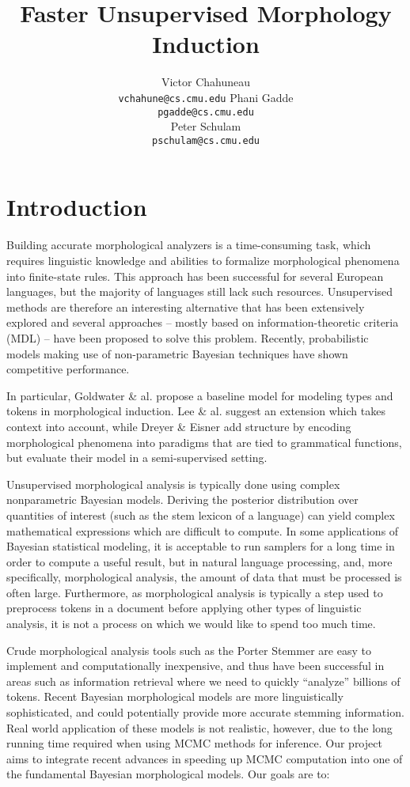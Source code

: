 \documentclass{article}
\title{Faster Unsupervised Morphology Induction}
\author{
Victor Chahuneau\\
\texttt{vchahune@cs.cmu.edu}
\And
Phani Gadde\\
\texttt{pgadde@cs.cmu.edu} \\
\And
Peter Schulam\\
\texttt{pschulam@cs.cmu.edu}
}
\begin{document}
\maketitle

\section{Introduction}
\label{sec:introduction}

Building accurate morphological analyzers is a time-consuming task,
which requires linguistic knowledge and abilities to formalize
morphological phenomena into finite-state rules. This approach has
been successful for several European languages, but the majority of
languages still lack such resources. Unsupervised methods are
therefore an interesting alternative that has been extensively
explored and several approaches -- mostly based on
information-theoretic criteria (MDL) -- have been proposed to solve
this problem. Recently, probabilistic models making use of
non-parametric Bayesian techniques have shown competitive performance.

In particular, Goldwater \& al. \cite{goldwater2011} propose a
baseline model for modeling types and tokens in morphological
induction. Lee \& al. \cite{lee2011} suggest an extension which takes
context into account, while Dreyer \& Eisner \cite{dreyer2011} add
structure by encoding morphological phenomena into paradigms that are
tied to grammatical functions, but evaluate their model in a
semi-supervised setting.

Unsupervised morphological analysis is typically done using complex
nonparametric Bayesian models. Deriving the posterior distribution
over quantities of interest (such as the stem lexicon of a language)
can yield complex mathematical expressions which are difficult to
compute. In some applications of Bayesian statistical modeling, it is
acceptable to run samplers for a long time in order to compute a
useful result, but in natural language processing, and, more
specifically, morphological analysis, the amount of data that must be
processed is often large. Furthermore, as morphological analysis is
typically a step used to preprocess tokens in a document before
applying other types of linguistic analysis, it is not a process on
which we would like to spend too much time.

Crude morphological analysis tools such as the Porter Stemmer are easy
to implement and computationally inexpensive, and thus have been
successful in areas such as information retrieval where we need to
quickly ``analyze'' billions of tokens. Recent Bayesian morphological
models are more linguistically sophisticated, and could potentially
provide more accurate stemming information. Real world application of
these models is not realistic, however, due to the long running time
required when using MCMC methods for inference. Our project aims to
integrate recent advances in speeding up MCMC computation into one of
the fundamental Bayesian morphological models. Our goals are to:
\end{document}
